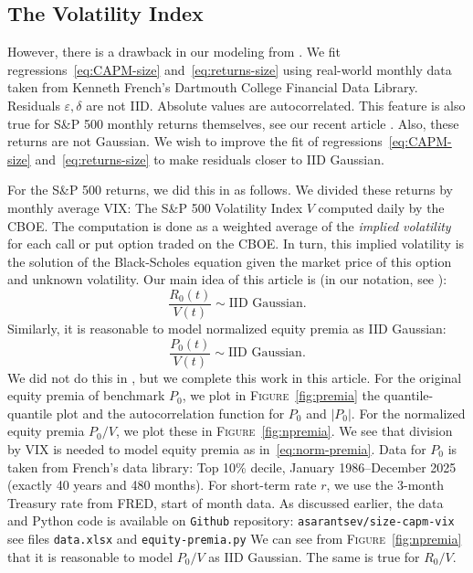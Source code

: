 \documentclass[12pt]{amsart}
\begin{document}
\subsection{The Volatility Index} However, there is a drawback in our modeling from \cite{CAPM-size}. We fit regressions~\eqref{eq:CAPM-size} and~\eqref{eq:returns-size} using real-world monthly data taken from Kenneth French's Dartmouth College Financial Data Library. Residuals $\varepsilon, \delta$ are not IID. Absolute values are autocorrelated. This feature is also true for S\&P 500 monthly returns themselves, see our recent article \cite{VIX}. Also, these returns are not Gaussian. We wish to improve the fit of regressions~\eqref{eq:CAPM-size} and~\eqref{eq:returns-size} to make residuals closer to IID Gaussian. 

For the S\&P 500 returns, we did this in \cite{VIX} as follows. We divided these returns by monthly average VIX: The S\&P 500 Volatility Index $V$ computed daily by the CBOE. The computation is done as a weighted average of the {\it implied volatility} for each call or put option traded on the CBOE. In turn, this implied volatility is the solution of the Black-Scholes equation given the market price of this option and unknown volatility. Our main idea of this article \cite{VIX} is (in our notation, see \cite[Subsection 2.2]{VIX}):
\begin{equation}
\label{eq:norm-return}
\frac{R_0(t)}{V(t)} \sim \mbox{IID Gaussian}.
\end{equation}
Similarly, it is reasonable to model normalized equity premia as IID Gaussian:
\begin{equation}
\label{eq:norm-premia}
\frac{P_0(t)}{V(t)} \sim \mbox{IID Gaussian}.
\end{equation}
We did not do this in \cite{VIX}, but we complete this work in this article. For the original equity premia of benchmark $P_0$, we plot in \textsc{Figure}~\ref{fig:premia} the quantile-quantile plot and the autocorrelation function for $P_0$ and $|P_0|$. For the normalized equity premia $P_0/V$, we plot these in \textsc{Figure}~\ref{fig:npremia}. We see that division by VIX is needed to model equity premia as in~\eqref{eq:norm-premia}. Data for $P_0$ is taken from French's data library: Top 10\% decile, January 1986--December 2025 (exactly 40 years and 480 months). For short-term rate $r$, we use the 3-month Treasury rate from FRED,  start of month data. As discussed earlier, the data and Python code is available on \texttt{Github} repository: \texttt{asarantsev/size-capm-vix} see files \texttt{data.xlsx} and \texttt{equity-premia.py} We can see from \textsc{Figure}~\ref{fig:npremia} that it is reasonable to model $P_0/V$ as IID Gaussian. The same is true for $R_0/V$. 
\end{document}

